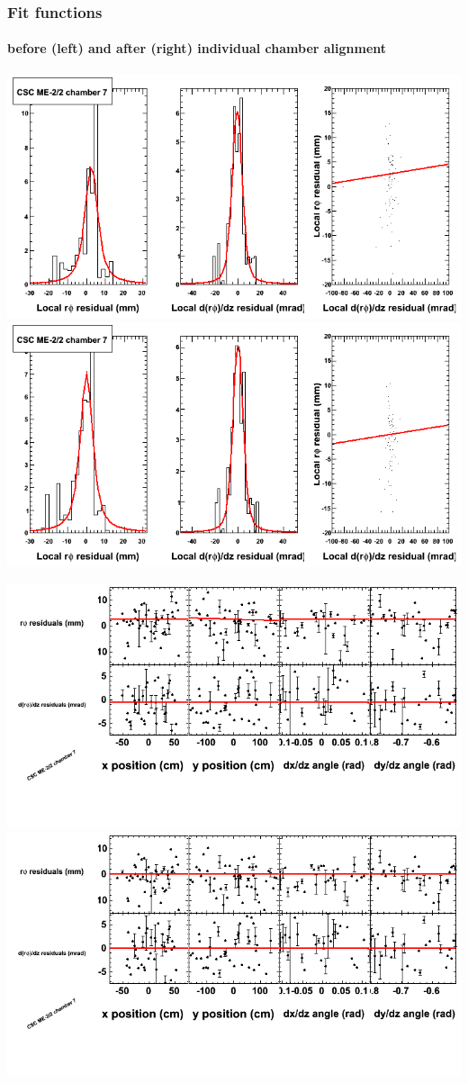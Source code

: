 \documentclass[compress]{beamer}
\begin{document}
\begin{frame}
\frametitle{Fit functions}
\framesubtitle{before (left) and after (right) individual chamber alignment}
\includegraphics[width=0.5\linewidth]{ringfits_3dof/beforefit_MEm22_07_bellcurve.png} \includegraphics[width=0.5\linewidth]{ringfits_3dof/afterfit_MEm22_07_bellcurve.png}

\includegraphics[width=0.5\linewidth]{ringfits_3dof/beforefit_MEm22_07_polynomials.png} \includegraphics[width=0.5\linewidth]{ringfits_3dof/afterfit_MEm22_07_polynomials.png}
\end{frame}
\end{document}

